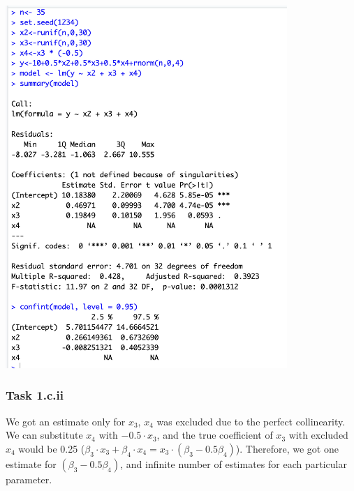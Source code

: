 \documentclass[12pt]{article}
\begin{document}
\includegraphics[width=0.8\textwidth]{1_c_i.png}

\subsubsection*{Task 1.c.ii}

We got an estimate only for $x_3$, $x_4$ was excluded due to the perfect collinearity. We can substitute $x_4$ with $-0.5\cdot x_3$, and the true coefficient of $x_3$ with excluded $x_4$ would be 0.25 ($\beta_3 \cdot x_3 + \beta_4 \cdot x_4 = x_3 \cdot (\beta_3 - 0.5\beta_4)$). Therefore, we got one estimate for $(\beta_3 - 0.5\beta_4)$, and infinite number of estimates for each particular parameter. 
\end{document}
